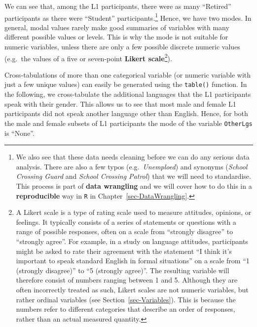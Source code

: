 \documentclass[
  letterpaper,
  DIV=11,
  numbers=noendperiod]{scrreprt}
\newenvironment{Shaded}{\begin{snugshade}}{\end{snugshade}}
\newcommand{\FunctionTok}[1]{\textcolor[rgb]{0.28,0.35,0.67}{#1}}
\newcommand{\NormalTok}[1]{\textcolor[rgb]{0.00,0.23,0.31}{#1}}
\newcommand{\SpecialCharTok}[1]{\textcolor[rgb]{0.37,0.37,0.37}{#1}}
\begin{document}
We can see that, among the L1 participants, there were as many
``Retired'' participants as there were ``Student''
participants.\footnote{We also see that these data needs cleaning before
  we can do any serious data analysis. There are also a few typos
  (e.g.~\emph{Unemploed}) and synonyms (\emph{School Crossing Guard} and
  \emph{School Crossing Patrol}) that we will need to standardise. This
  process is part of \textbf{data wrangling} and we will cover how to do
  this in a \textbf{reproducible} way in \texttt{R} in
  Chapter~\ref{sec-DataWrangling}.} Hence, we have two modes. In
general, modal values rarely make good summaries of variables with many
different possible values or levels. This is why the mode is not
suitable for numeric variables, unless there are only a few possible
discrete numeric values (e.g.~the values of a five or seven-point
\textbf{Likert scale}\footnote{A Likert scale is a type of rating scale
  used to measure attitudes, opinions, or feelings. It typically
  consists of a series of statements or questions with a range of
  possible responses, often on a scale from ``strongly disagree'' to
  ``strongly agree''. For example, in a study on language attitudes,
  participants might be asked to rate their agreement with the statement
  ``I think it's important to speak standard English in formal
  situations'' on a scale from ``1 (strongly disagree)'' to ``5
  (strongly agree)''. The resulting variable will therefore consist of
  numbers ranging between 1 and 5. Although they are often incorrectly
  treated as such, Likert scales are not numeric variables, but rather
  ordinal variables (see Section~\ref{sec-Variables}). This is because
  the numbers refer to different categories that describe an order of
  responses, rather than an actual measured quantity.}).

Cross-tabulations of more than one categorical variable (or numeric
variable with just a few unique values) can easily be generated using
the \texttt{table()} function. In the following, we cross-tabulate the
additional languages that the L1 participants speak with their gender.
This allows us to see that most male and female L1 participants did not
speak another language other than English. Hence, for both the male and
female subsets of L1 participants the mode of the variable
\texttt{OtherLgs} is ``None''.

\begin{Shaded}
\end{Shaded}
\end{document}

